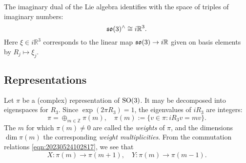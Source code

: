 \documentclass[reqno]{amsart} 
\numberwithin{equation}{section}
\begin{document}
The imaginary dual of the Lie algebra identifies with the space of triples of imaginary numbers:
\begin{equation}\label{eqn:d1a914f48fd7}
  \operatorname{\mathfrak{s}\mathfrak{o}}(3)^\wedge \cong  i \mathbb{R}^3.
\end{equation}
Here $\xi \in i \mathbb{R}^3$ corresponds to the linear map $\operatorname{\mathfrak{s}\mathfrak{o}}(3) \rightarrow i \mathbb{R}$ given on basis elements by $R_j \mapsto \xi_j$.

\subsection{Representations}\label{sec:d1a9162ec67d}
Let $\pi$ be a (complex) representation of $\operatorname{SO}(3)$.  It may be decomposed into eigenspaces for $R_3$.  Since $\exp(2 \pi R_3) = 1$, the eigenvalues of $i R_3$ are integers:
\begin{equation*}
  \pi = \oplus_{m \in \mathbb{Z}} \pi(m),
  \quad
  \pi(m) := \{ v \in \pi : i R_3 v = m v \}.
\end{equation*}
The $m$ for which $\pi(m) \neq 0$ are called the \emph{weights} of $\pi$, and the dimensions $\dim \pi(m)$ the corresponding \emph{weight multiplicities}.  From the commutation relations \eqref{eqn:20230524102817}, we see that
\begin{equation}\label{eqn:20230524104326}
  X : \pi(m) \rightarrow \pi(m+1),
  \quad
  Y : \pi(m) \rightarrow \pi(m-1).
\end{equation}
\end{document}
